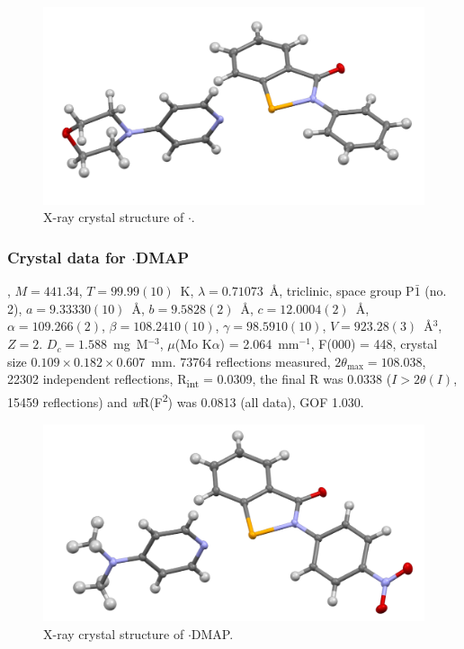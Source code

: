 \begin{refsection}
\begin{figure}
  \includegraphics[width=0.6\linewidth]{Figures/ebs-morph-xtal.pdf}
  \caption{X-ray crystal structure of \texorpdfstring{$\cdot$}{C22 H21 N3 O2 Se}.}
\end{figure}

\subsubsection{Crystal data for \texorpdfstring{$\cdot$DMAP}{C20 H18 N4 O3 Se}}
, $M=441.34$, $T=99.99(10)$~K, $\lambda=0.71073$~\AA, triclinic, space group P$\bar{1}$ (no. 2), $a = 9.33330(10)$~\AA, $b = 9.5828(2)$~\AA, $c = 12.0004(2)$~\AA, $\alpha = 109.266(2)$\degree, $\beta = 108.2410(10)$\degree, $\gamma = 98.5910(10)$\degree, $V = 923.28(3)$~\AA$^{3}$, $Z = 2$. $D_{c}= 1.588$~mg~M$^{-3}$, $\mu$(Mo K$\alpha$) = 2.064~mm$^{-1}$, F(000) = 448, crystal size $0.109 \times 0.182 \times 0.607$~mm. 73764 reflections measured, $2\theta_{\mathrm{max}}=108.038$\degree, 22302 independent reflections, R\textsubscript{int} = 0.0309, the final R was 0.0338 ($I > 2\theta(I)$, 15459 reflections) and \emph{w}R(F\textsuperscript{2}) was 0.0813 (all data), GOF 1.030.

\begin{figure}
  \includegraphics[width=0.6\linewidth]{Figures/ebs-4no2-dmap-xtal.pdf}
  \caption{X-ray crystal structure of \texorpdfstring{$\cdot$DMAP}{C20 H18 N4 O3 Se}.}
\end{figure}


\end{refsection}
